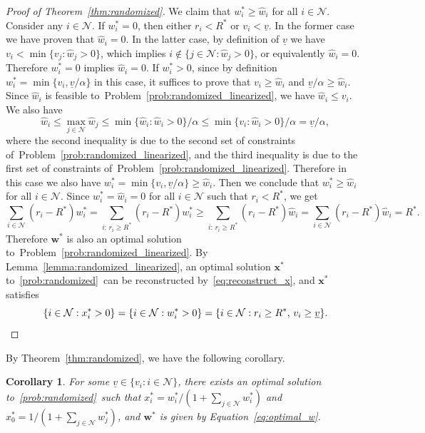 \documentclass[mnsc,non-blindrev]{informs3}
\newtheorem{corollary}[theorem]{Corollary}
\theoremstyle{definition}
\begin{document}
\begin{proof}[Proof of Theorem~\ref{thm:randomized}]
We claim that $w_i^*\geq \hat{w}_i$ for all $i\in\mathcal{N}$. Consider any $i\in\mathcal{N}$. If $w_i^*=0$, then either $r_i<R^*$ or $v_i<\underline{v}$. In the former case we have proven that $\hat{w}_i=0$. In the latter case, by definition of $\underline{v}$ we have $v_i<\min\{v_j:\hat{w}_j>0\}$, which implies $i\notin \{j\in\mathcal{N}:\hat{w}_j>0\}$, or equivalently $\hat{w}_i=0$. Therefore $w_i^*=0$ implies $\hat{w}_i=0$. If $w_i^*>0$, since by definition $w_i^*=\min\{v_i,\underline{v}/\alpha\}$ in this case, it suffices to prove that $v_i\geq \hat{w}_i$ and $\underline{v}/\alpha\geq \hat{w}_i$. Since $\hat{w}_i$ is feasible to~Problem~\eqref{prob:randomized_linearized}, we have $\hat{w}_i\leq v_i$. We also have
\begin{equation*}
\hat{w}_i\leq \max_{j\in\mathcal{N}}\hat{w}_j\leq \min\{\hat{w}_i:\hat{w}_i>0\}/\alpha\leq \min\{v_i:\hat{w}_i>0\}/\alpha=\underline{v}/\alpha,
\end{equation*}
where the second inequality is due to the second set of constraints of~Problem~\eqref{prob:randomized_linearized}, and the third inequality is due to the first set of constraints of~Problem~\eqref{prob:randomized_linearized}. Therefore in this case we also have $w_i^*=\min\{v_i,\underline{v}/\alpha\}\geq \hat{w}_i$. Then we conclude that $w_i^*\geq \hat{w}_i$ for all $i\in\mathcal{N}$. Since $w_i^*=\hat{w}_i=0$ for all $i\in\mathcal{N}$ such that $r_i<R^*$, we get
\begin{equation*}
\sum_{i\in\mathcal{N}}(r_i-R^*)w_i^*=\sum_{i:\,r_i\geq R^*}(r_i-R^*)w_i^*
\geq\sum_{i:\,r_i\geq R^*}(r_i-R^*)\hat{w}_i=\sum_{i\in\mathcal{N}}(r_i-R^*)\hat{w}_i=R^*.
\end{equation*}
Therefore $\bm{w}^*$ is also an optimal solution to~Problem~\eqref{prob:randomized_linearized}. By Lemma~\ref{lemma:randomized_linearized}, an optimal solution $\bm{x}^*$ to~\ref{prob:randomized}~can be reconstructed by~\eqref{eq:reconstruct_x}, and $\bm{x}^*$ satisfies
\begin{equation*}
\{i\in\mathcal{N}:x_i^*>0\}=\{i\in\mathcal{N}:w_i^*>0\}=\{i\in\mathcal{N}:r_i\geq R^*,\,v_i\geq \underline{v}\}.\qedhere
\end{equation*}
\end{proof}

By Theorem~\ref{thm:randomized}, we have the following corollary.

\vspace{0.5em}

\begin{corollary}\label{cor:optimal_x}
For some $\underline{v}\in\{v_i:{  i}\in\mathcal{N}\}$, there exists an optimal solution to~\ref{prob:randomized}~such that $x_i^*=w_i^*/(1+\sum_{j\in\mathcal{N}}w_i^*)$ and $x_0^*=1/(1+\sum_{j\in\mathcal{N}}w_j^*)$, and $\bm{w}^*$ is given by Equation~\eqref{eq:optimal_w}.
\end{corollary}
\end{document}
